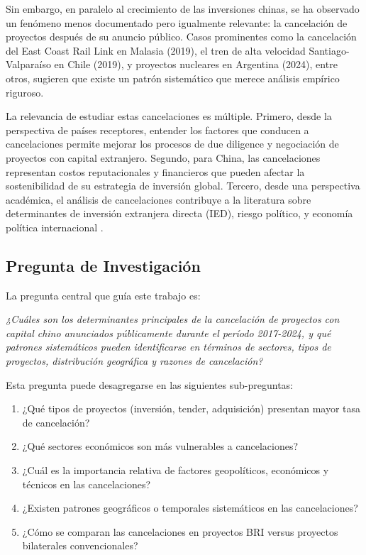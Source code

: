 \documentclass[12pt]{article}
\begin{document}
Sin embargo, en paralelo al crecimiento de las inversiones chinas, se ha observado un fenómeno menos documentado pero igualmente relevante: la cancelación de proyectos después de su anuncio público. Casos prominentes como la cancelación del East Coast Rail Link en Malasia (2019), el tren de alta velocidad Santiago-Valparaíso en Chile (2019), y proyectos nucleares en Argentina (2024), entre otros, sugieren que existe un patrón sistemático que merece análisis empírico riguroso.

La relevancia de estudiar estas cancelaciones es múltiple. Primero, desde la perspectiva de países receptores, entender los factores que conducen a cancelaciones permite mejorar los procesos de due diligence y negociación de proyectos con capital extranjero. Segundo, para China, las cancelaciones representan costos reputacionales y financieros que pueden afectar la sostenibilidad de su estrategia de inversión global. Tercero, desde una perspectiva académica, el análisis de cancelaciones contribuye a la literatura sobre determinantes de inversión extranjera directa (IED), riesgo político, y economía política internacional \citep{kobrin1979political, henisz2000institutional}.

\subsection{Pregunta de Investigación}

La pregunta central que guía este trabajo es:

\textit{¿Cuáles son los determinantes principales de la cancelación de proyectos con capital chino anunciados públicamente durante el período 2017-2024, y qué patrones sistemáticos pueden identificarse en términos de sectores, tipos de proyectos, distribución geográfica y razones de cancelación?}

Esta pregunta puede desagregarse en las siguientes sub-preguntas:

\begin{enumerate}[label=\roman*.]
    \item ¿Qué tipos de proyectos (inversión, tender, adquisición) presentan mayor tasa de cancelación?
    \item ¿Qué sectores económicos son más vulnerables a cancelaciones?
    \item ¿Cuál es la importancia relativa de factores geopolíticos, económicos y técnicos en las cancelaciones?
    \item ¿Existen patrones geográficos o temporales sistemáticos en las cancelaciones?
    \item ¿Cómo se comparan las cancelaciones en proyectos BRI versus proyectos bilaterales convencionales?
\end{enumerate}
\end{document}
